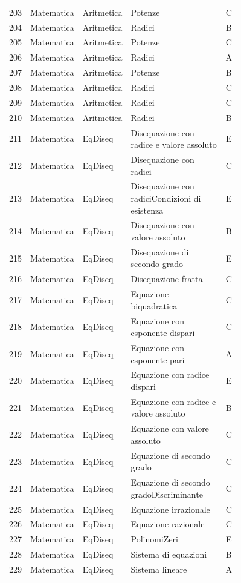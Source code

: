 \documentclass[20pt, a4paper]{article}
\begin{document}
\begin{longtable}{@{}r>{\raggedright\arraybackslash}p{0.14\linewidth}>{\raggedright\arraybackslash}p{0.20\linewidth}>{\raggedright\arraybackslash}p{0.42\linewidth}c@{}}
203 & Matematica & Aritmetica & Potenze & C \\
204 & Matematica & Aritmetica & Radici & B \\
205 & Matematica & Aritmetica & Potenze & C \\
206 & Matematica & Aritmetica & Radici & A \\
207 & Matematica & Aritmetica & Potenze & B \\
208 & Matematica & Aritmetica & Radici & C \\
209 & Matematica & Aritmetica & Radici & C \\
210 & Matematica & Aritmetica & Radici & B \\
211 & Matematica & EqDiseq & Disequazione con radice e valore assoluto & E \\
212 & Matematica & EqDiseq & Disequazione con radici & C \\
213 & Matematica & EqDiseq & Disequazione con radiciCondizioni di esistenza & E \\
214 & Matematica & EqDiseq & Disequazione con valore assoluto & B \\
215 & Matematica & EqDiseq & Disequazione di secondo grado & E \\
216 & Matematica & EqDiseq & Disequazione fratta & C \\
217 & Matematica & EqDiseq & Equazione biquadratica & C \\
218 & Matematica & EqDiseq & Equazione con esponente dispari & C \\
219 & Matematica & EqDiseq & Equazione con esponente pari & A \\
220 & Matematica & EqDiseq & Equazione con radice dispari & E \\
221 & Matematica & EqDiseq & Equazione con radice e valore assoluto & B \\
222 & Matematica & EqDiseq & Equazione con valore assoluto & C \\
223 & Matematica & EqDiseq & Equazione di secondo grado & C \\
224 & Matematica & EqDiseq & Equazione di secondo gradoDiscriminante & C \\
225 & Matematica & EqDiseq & Equazione irrazionale & C \\
226 & Matematica & EqDiseq & Equazione razionale & C \\
227 & Matematica & EqDiseq & PolinomiZeri & E \\
228 & Matematica & EqDiseq & Sistema di equazioni & B \\
229 & Matematica & EqDiseq & Sistema lineare & A \\

\end{longtable}
\end{document}
